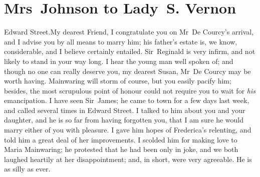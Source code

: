 \chapter{Mrs~Johnson to Lady~S. Vernon}
  
  \begin{mail}{Edward Street.}{My dearest Friend,}
 I congratulate you on Mr~De Courcy's arrival, and I advise you by all means to marry him; his father's estate is, we know, considerable, and I believe certainly entailed. Sir~Reginald is very infirm, and not likely to stand in your way long. I hear the young man well spoken of; and though no one can really deserve you, my dearest Susan, Mr~De Courcy may be worth having. Mainwaring will storm of course, but you easily pacify him; besides, the most scrupulous point of honour could not require you to wait for \textit{his} emancipation. I have seen Sir~James; he came to town for a few days last week, and called several times in Edward Street. I talked to him about you and your daughter, and he is so far from having forgotten you, that I am sure he would marry either of you with pleasure. I gave him hopes of Frederica's relenting, and told him a great deal of her improvements. I scolded him for making love to Maria Mainwaring; he protested that he had been only in joke, and we both laughed heartily at her disappointment; and, in short, were very agreeable. He is as silly as ever. 

\end{mail}